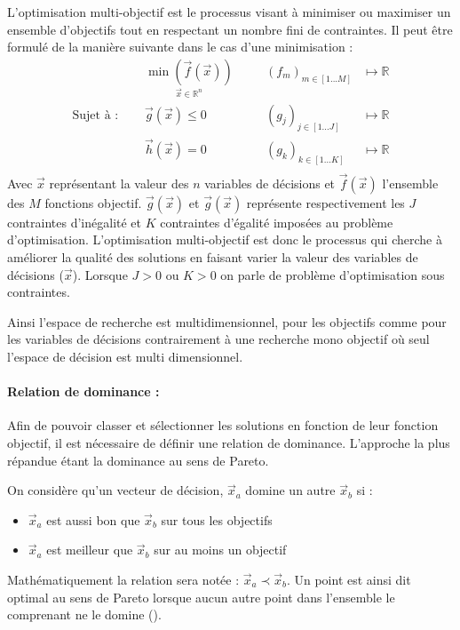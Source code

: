 \begin{Def}\label{def:optimisation_multi_objectif}
L’optimisation multi-objectif est le processus visant à minimiser ou maximiser un ensemble
d’objectifs tout en respectant un nombre fini de contraintes.
Il peut être formulé de la manière suivante dans le cas d’une minimisation :
\begin{equation}\label{eq:def_optimisation}
  \begin{aligned}
                           & \underset{\vec{x} \in \mathbb{R}^{n}}{\min(\vec{f}(\vec{x}))}& & \quad (f_{m})_{m \in [1 ... M]} & \longmapsto \mathbb{R} \\
    \text{Sujet à : }\quad & \vec{g}(\vec{x}) \leqslant 0                                 & & \quad (g_{j})_{j \in [1 ... J]} & \longmapsto \mathbb{R} \\
                           & \vec{h}(\vec{x}) = 0                                         & & \quad (g_{k})_{k \in [1 ... K]} & \longmapsto \mathbb{R} \\
  \end{aligned}
\end{equation}
Avec $\vec{x}$ représentant la valeur des $n$ variables de décisions et $\vec{f}(\vec{x})$
l’ensemble des $M$ fonctions objectif.  $\vec{g}(\vec{x})$ et $\vec{g}(\vec{x})$ représente
respectivement les $J$ contraintes d’inégalité et $K$ contraintes d’égalité imposées au problème
d’optimisation. L’optimisation multi-objectif est donc le processus qui cherche à améliorer la
qualité des solutions en faisant varier la valeur des variables de décisions ($\vec{x}$).
Lorsque $J > 0$ ou $K > 0$ on parle de problème d’optimisation sous contraintes.
\end{Def}
Ainsi l’espace de recherche est multidimensionnel, pour les objectifs comme pour
les variables de décisions contrairement à une recherche mono objectif où seul
l’espace de décision est multi dimensionnel.

\paragraph{Relation de dominance :} %
\label{par:relation_de_dominance}
Afin de pouvoir classer et sélectionner les solutions en fonction de leur fonction
objectif, il est nécessaire de définir une relation de dominance.
L’approche la plus répandue étant la dominance au sens de Pareto.

\begin{Def}\label{def:dominance_de_pareto}
On considère qu’un vecteur de décision, $\vec{x}_{a}$ domine un autre $\vec{x}_{b}$ si :
\begin{itemize}
  \item $\vec{x}_{a}$ est aussi bon que $\vec{x}_{b}$ sur tous les objectifs
  \item $\vec{x}_{a}$ est meilleur que $\vec{x}_{b}$ sur au moins un objectif
\end{itemize}
Mathématiquement la relation sera notée : $\vec{x}_{a} \prec \vec{x}_{b}$.
Un point est ainsi dit optimal au sens de Pareto lorsque aucun autre point dans
l’ensemble le comprenant ne le domine ().
\end{Def} 

